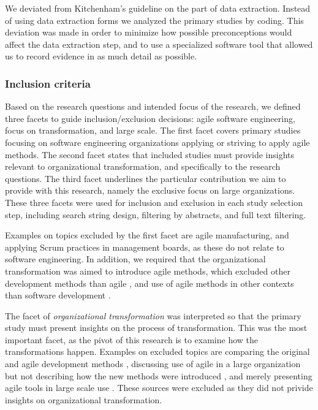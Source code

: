 \documentclass[preprint,authoryear,12pt]{elsarticle}
\begin{document}
We deviated from Kitchenham's guideline on the part of data extraction. Instead
of using data extraction forms we analyzed the primary studies by coding. This
deviation was made in order to minimize how possible preconceptions would affect
the data extraction step, and to use a specialized software tool that allowed us
to record evidence in as much detail as possible.

\subsubsection{Inclusion criteria}
\label{sec:inclusioncriteria}

Based on the research questions and intended focus of the research, we defined
three facets to guide inclusion/exclusion decisions: agile software engineering,
focus on transformation, and large scale. The first facet covers primary studies
focusing on software engineering organizations applying or striving to apply
agile methods. The second facet states that included studies must provide
insights relevant to organizational transformation, and specifically to the
research questions. The third facet underlines the particular contribution we
aim to provide with this research, namely the exclusive focus on large
organizations. These three facets were used for inclusion and exclusion in each
study selection step, including search string design, filtering by abstracts,
and full text filtering.

Examples on topics excluded by the first facet are agile manufacturing, and
applying Scrum practices in management boards, as these do not relate to
software engineering. In addition, we required that the organizational
transformation was aimed to introduce agile methods, which excluded other
development methods than agile \cite{Sagesser2013}, and use of agile
methods in other contexts than software development \cite{Hodgkins2007}.

The facet of \emph{organizational transformation} was interpreted so that the
primary study must present insights on the process of transformation. This
was the most important facet, as the pivot of this research is to examine
how the transformations happen. Examples on excluded topics are comparing the
original and agile development methods \cite{Petersen2010}, discussing use of
agile in a large organization but not describing how the new methods were
introduced \cite{Mishra2011}, and merely presenting agile tools in large scale
use \cite{Kim2012}. These sources were excluded as they did not privide insights
on organizational transformation.
\end{document}
